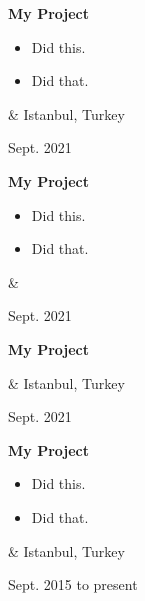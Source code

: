 \documentclass[10pt, letterpaper]{article}
\newenvironment{highlights}{
        \begin{itemize}[
                topsep=0pt,
                parsep=0.10 cm,
                partopsep=0pt,
                itemsep=0pt,
                after=\relax,
                leftmargin=0.4 cm + 3pt
            ]
    }{
        \end{itemize}
    } %
\let\originalTabularx\tabularx
\let\originalEndTabularx\endtabularx
\renewenvironment{tabularx}{\bgroup\centering\originalTabularx}{\originalEndTabularx\par\egroup}
\begin{document}
        \vspace{0.2 cm}
        \begin{tabularx}{
            \textwidth-0.4 cm-0.13cm
        }{
            K{0.2 cm}
            R{4.1 cm}
        }
            \textbf{My Project}

            \vspace{0.10 cm}

            \begin{highlights}
                \item Did this.
                \item Did that.
            \end{highlights}
            &
            Istanbul, Turkey

            Sept. 2021
        \end{tabularx}


        \vspace{0.2 cm}
        \begin{tabularx}{
            \textwidth-0.4 cm-0.13cm
        }{
            K{0.2 cm}
            R{4.1 cm}
        }
            \textbf{My Project}

            \vspace{0.10 cm}

            \begin{highlights}
                \item Did this.
                \item Did that.
            \end{highlights}
            &
            

            Sept. 2021
        \end{tabularx}


        \vspace{0.2 cm}
        \begin{tabularx}{
            \textwidth-0.4 cm-0.13cm
        }{
            K{0.2 cm}
            R{4.1 cm}
        }
            \textbf{My Project}

            \vspace{0.10 cm}

            &
            Istanbul, Turkey

            Sept. 2021
        \end{tabularx}


        \vspace{0.2 cm}
        \begin{tabularx}{
            \textwidth-0.4 cm-0.13cm
        }{
            K{0.2 cm}
            R{4.1 cm}
        }
            \textbf{My Project}

            \vspace{0.10 cm}

            \begin{highlights}
                \item Did this.
                \item Did that.
            \end{highlights}
            &
            Istanbul, Turkey

            Sept. 2015 to present
        \end{tabularx}
\end{document}
